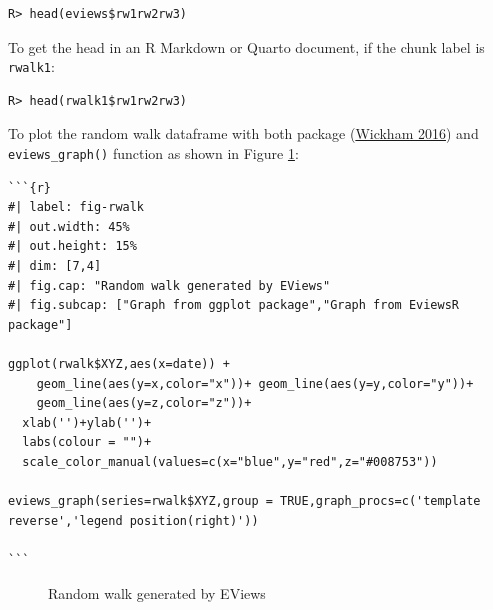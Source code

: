 \begin{verbatim}
R> head(eviews$rw1rw2rw3)
\end{verbatim}

To get the head in an R Markdown or Quarto document, if the chunk label is \texttt{rwalk1}:

\begin{verbatim}
R> head(rwalk1$rw1rw2rw3)
\end{verbatim}

To plot the random walk dataframe with both  package (\protect\hyperlink{ref-Wickham2016}{Wickham 2016}) and \texttt{eviews\_graph()} function as shown in Figure \ref{fig:fig-rwalk}:

\begin{verbatim}
```{r}  
#| label: fig-rwalk
#| out.width: 45%
#| out.height: 15%
#| dim: [7,4]
#| fig.cap: "Random walk generated by EViews"
#| fig.subcap: ["Graph from ggplot package","Graph from EviewsR package"]

ggplot(rwalk$XYZ,aes(x=date)) +
    geom_line(aes(y=x,color="x"))+ geom_line(aes(y=y,color="y"))+
    geom_line(aes(y=z,color="z"))+
  xlab('')+ylab('')+
  labs(colour = "")+
  scale_color_manual(values=c(x="blue",y="red",z="#008753"))
  
eviews_graph(series=rwalk$XYZ,group = TRUE,graph_procs=c('template reverse','legend position(right)'))

```
\end{verbatim}

\begin{figure}

{\centering {}

}

\caption{Random walk generated by EViews}\label{fig:fig-rwalk}
\end{figure}

